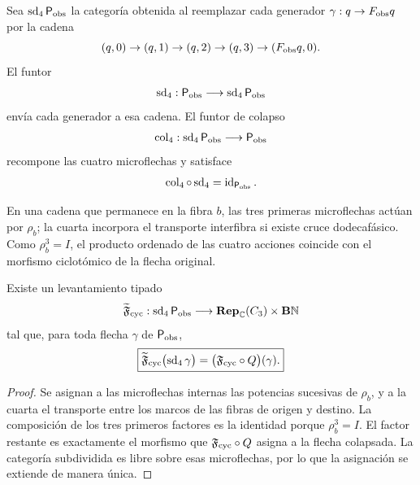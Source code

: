 Sea \(\operatorname{sd}_4\mathsf P_{\rm obs}\) la categoría obtenida al
reemplazar cada generador
\(\gamma:q\to F_{\rm obs}q\) por la cadena
\begin{equation}
 (q,0)\to(q,1)\to(q,2)\to(q,3)\to(F_{\rm obs}q,0).
 \label{p12-83-c1-s12:eq:u006c-cadena-subdivision}
\end{equation}
El funtor
\[
 \operatorname{sd}_4:
 \mathsf P_{\rm obs}\longrightarrow
 \operatorname{sd}_4\mathsf P_{\rm obs}
\]
envía cada generador a esa cadena. El funtor de colapso
\[
 \operatorname{col}_4:
 \operatorname{sd}_4\mathsf P_{\rm obs}
 \longrightarrow\mathsf P_{\rm obs}
\]
recompone las cuatro microflechas y satisface
\begin{equation}
 \operatorname{col}_4\circ\operatorname{sd}_4
 =\operatorname{id}_{\mathsf P_{\rm obs}}.
 \label{p12-83-c1-s12:eq:u006c-colapso}
\end{equation}

En una cadena que permanece en la fibra \(b\), las tres primeras
microflechas actúan por \(\rho_b\); la cuarta incorpora el transporte
interfibra si existe cruce dodecafásico. Como \(\rho_b^3=I\), el producto
ordenado de las cuatro acciones coincide con el morfismo ciclotómico de la
flecha original.

\begin{proposition}
\label{p12-83-c1-s12:prop:u006c-invariancia-ciclotomica}
Existe un levantamiento tipado
\[
 \widetilde{\mathfrak F}_{\rm cyc}:
 \operatorname{sd}_4\mathsf P_{\rm obs}
 \longrightarrow
 \mathbf{Rep}_{\mathbb C}(C_3)\times\mathbf B\mathbb N
\]
tal que, para toda flecha \(\gamma\) de
\(\mathsf P_{\rm obs}\),
\begin{equation}
 \boxed{
 \widetilde{\mathfrak F}_{\rm cyc}
 \bigl(\operatorname{sd}_4\gamma\bigr)
 =
 \bigl(\mathfrak F_{\rm cyc}\circ Q\bigr)(\gamma).}
 \label{p12-83-c1-s12:eq:u006c-invariancia-ciclotomica}
\end{equation}
\end{proposition}

\begin{proof}
Se asignan a las microflechas internas las potencias sucesivas de
\(\rho_b\), y a la cuarta el transporte entre los marcos de las fibras de
origen y destino. La composición de los tres primeros factores es la
identidad porque \(\rho_b^3=I\). El factor restante es exactamente el
morfismo que \(\mathfrak F_{\rm cyc}\circ Q\) asigna a la flecha
colapsada. La categoría subdividida es libre sobre esas microflechas, por lo
que la asignación se extiende de manera única.
\end{proof}

